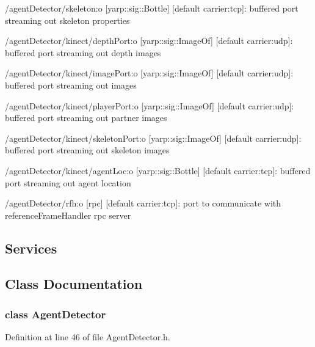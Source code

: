 \begin{DoxyItemize}
\item /agent\+Detector/skeleton\+:o \mbox{[}yarp\+::sig\+::\+Bottle\mbox{]} \mbox{[}default carrier\+:tcp\mbox{]}\+: buffered port streaming out skeleton properties
\item /agent\+Detector/kinect/depth\+Port\+:o \mbox{[}yarp\+::sig\+::\+Image\+Of\mbox{]} \mbox{[}default carrier\+:udp\mbox{]}\+: buffered port streaming out depth images
\item /agent\+Detector/kinect/image\+Port\+:o \mbox{[}yarp\+::sig\+::\+Image\+Of\mbox{]} \mbox{[}default carrier\+:udp\mbox{]}\+: buffered port streaming out images
\item /agent\+Detector/kinect/player\+Port\+:o \mbox{[}yarp\+::sig\+::\+Image\+Of\mbox{]} \mbox{[}default carrier\+:udp\mbox{]}\+: buffered port streaming out partner images
\item /agent\+Detector/kinect/skeleton\+Port\+:o \mbox{[}yarp\+::sig\+::\+Image\+Of\mbox{]} \mbox{[}default carrier\+:udp\mbox{]}\+: buffered port streaming out skeleton images
\item /agent\+Detector/kinect/agent\+Loc\+:o \mbox{[}yarp\+::sig\+::\+Bottle\mbox{]} \mbox{[}default carrier\+:tcp\mbox{]}\+: buffered port streaming out agent location
\item /agent\+Detector/rfh\+:o \mbox{[}rpc\mbox{]} \mbox{[}default carrier\+:tcp\mbox{]}\+: port to communicate with reference\+Frame\+Handler rpc server
\end{DoxyItemize}\hypertarget{group__touchDetector_services_sec}{}\subsection{Services}\label{group__touchDetector_services_sec}


\subsection{Class Documentation}
\label{classAgentDetector}
\subsubsection{class Agent\+Detector}


Definition at line 46 of file Agent\+Detector.\+h.



